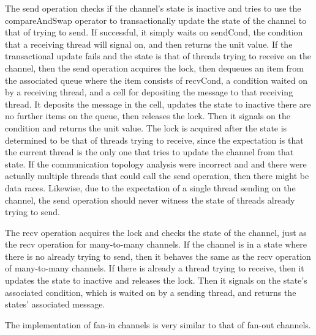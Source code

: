\documentclass{article}
\begin{document}
The send operation checks if the channel's state is inactive and tries to use the
compareAndSwap operator to transactionally update the state of the channel to that of trying to
send.  If successful, it simply waits on sendCond, the condition that a receiving thread will
signal on, and then returns the unit value.  If the transactional update fails and the state is
that of threads trying to receive on the channel, then the send operation acquires the lock,
then dequeues an item from the associated queue where the item consists of recvCond, a
condition waited on by a receiving thread, and a cell for depositing the message to that
receiving thread.  It deposits the message in the cell, updates the state to inactive there are
no further items on the queue, then releases the lock.  Then it signals on the condition and
returns the unit value. The lock is acquired after the state is determined to be that of
threads trying to receive, since the expectation is that the current thread is the only one
that tries to update the channel from that state.  If the communication topology analysis were
incorrect and and there were actually multiple threads that could call the send operation, then
there might be data races.  Likewise, due to the expectation of a single thread sending on the
channel, the send operation should never witness the state of threads already trying to send.

The recv operation acquires the lock and checks the state of the channel, just as the recv
operation for many-to-many channels.  If the channel is in a state where there is no already
trying to send, then it behaves the same as the recv operation of many-to-many channels. If
there is already a thread trying to receive, then it updates the state to inactive and releases
the lock.  Then it signals on the state's associated condition, which is waited on by a sending
thread, and returns the states' associated message.

The implementation of fan-in channels is very similar to that of fan-out channels.
\end{document}
